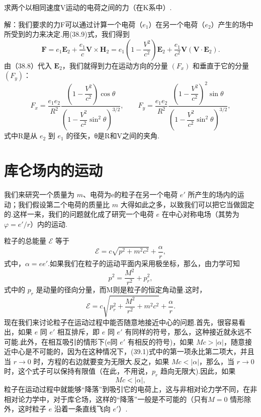 \begin{xiti}

\quad 求两个以相同速度V运动的电荷之间的力（在K系中）.

解：我们要求的力F可以通过计算一个电荷（$e_1$）在另一个电荷（$e_2$）产生的场中所受到的力来决定.用(38.9)式，我们得到
\begin{equation*}
  \boldsymbol{F}=e_1\boldsymbol{E}_2+\frac{e_1}{c}\boldsymbol{V}\times\boldsymbol{H}_2
  =e_1\left(1-\frac{V^2}{c^2}\right)\boldsymbol{E}_2
  +\frac{e_1}{c^2}\boldsymbol{V}(\boldsymbol{V}\cdot\boldsymbol{E}_2).
\end{equation*}
由（38.8）代入 $\boldsymbol{E}_2$，我们就得到力在运动方向的分量 $(F_x)$ 和垂直于它的分量 $(F_y)$：
\begin{equation*}
  F_x=\frac{e_1e_2}{R^2}
  \frac{\left(1-\dfrac{V^2}{c^2}\right)\cos\theta}{\left(1-\dfrac{V^2}{c^2}\sin^2\theta\right)^{3/2}},\qquad
  F_y=\frac{e_1e_2}{R^2}
  \frac{\left(1-\dfrac{V^2}{c^2}\right)^2\sin\theta}{\left(1-\dfrac{V^2}{c^2}\sin^2\theta\right)^{3/2}},
\end{equation*}
式中R是从 $e_2$ 到 $e_1$ 的径矢，θ是R和V之间的夹角.

\end{xiti}

\section{库仑场内的运动}

我们来研究一个质量为 $m$、电荷为e的粒子在另一个电荷 $e'$ 所产生的场内的运动；我们假设第二个电荷的质量比 $m$ 大得如此之多，以致我们可以把它当做固定的.这样一来，我们的问题就化成了研究一个电荷 $e$ 在中心对称电场（其势为 $\varphi = e'/r$）内的运动.

粒子的总能量 $\mathcal{E}$ 等于
\begin{equation*}
  \mathcal{E}=c\sqrt{p^2+m^2c^2}+\frac{\alpha}{r},
\end{equation*}
式中，$\alpha = ee'$.如果我们在粒子的运动平面内采用极坐标，那么，由力学可知
\begin{equation*}
  p^2=\frac{M^2}{r^2}+p_r^2,
\end{equation*}
式中的 $p_r$ 是动量的径向分量，而M则是粒子的恒定角动量.这时，
\begin{equation}
  \mathcal{E}=c\sqrt{p_r^2+\frac{M^2}{r^2}+m^2c^2}+\frac{\alpha}{r}.
\end{equation}
现在我们来讨论粒子在运动过程中能否随意地接近中心的问题.首先，很容易看出，如果 $e$ 同 $e'$ 相互排斥，即 $e$ 同 $e'$ 有同样的符号，那么，这种接近就永远不可能.此外，在相互吸引的情形下(e同 $e'$ 有相反的符号)，如果 $Mc>|\alpha|$，随意接近中心是不可能的，因为在这种情况下，(39.1)式中的第一项永比第二项大，并且当 $r\to 0$ 时，方程的右边就要变为无限大.反之，如果 $Mc<|\alpha|$，那么，当 $r\to 0$ 时，这个式子可以保持有限值（在此，不用说，$p_r$ 趋向无限大).因此，如果
\begin{equation}
  Mc<|\alpha|,
\end{equation}
粒子在运动过程中就能够“降落”到吸引它的电荷上，这与非相对论力学不同，在非相对论力学中，对于库仑场，这样的“降落”一般是不可能的（只有$M = 0$ 情形除外，这时粒子 $e$ 沿着一条直线飞向 $e'$）.

